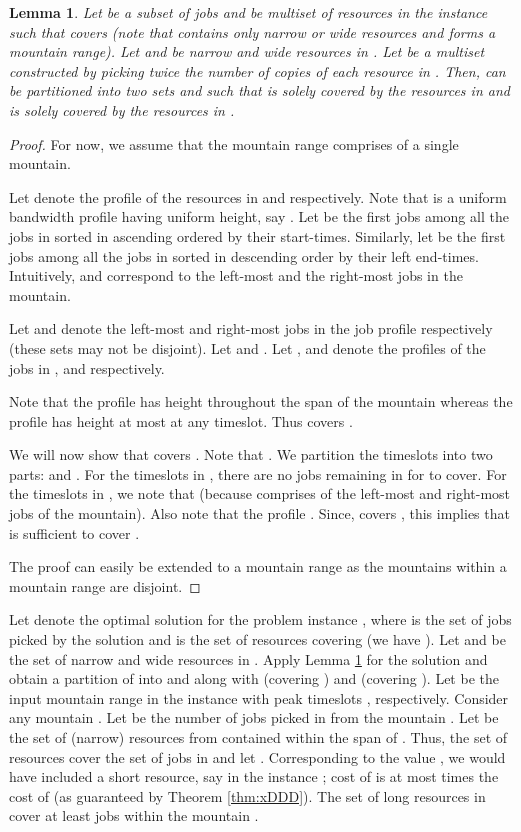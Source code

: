 \documentclass[11pt]{article}
\newtheorem{lemma}[theorem]{Lemma}
\newtheorem{proof}[theorem]{Proof}
\begin{document}
\begin{lemma}
\label{lem:LLL}
Let  be a subset of jobs and  be multiset of resources in the instance 
such that  covers  (note that  contains only narrow or wide resources and  forms a mountain range).
Let  and  be narrow and wide resources in . Let  be a multiset 
constructed by picking twice the number of copies of each resource in .
Then,  can be partitioned into two sets  and  such that  is solely covered by the resources in 
and  is solely covered by the resources in .
\end{lemma}
\begin{proof}
For now, we assume that the mountain range comprises of a single mountain.

Let  denote the profile of the resources in  and  respectively.
Note that  is a uniform bandwidth profile having uniform height, say .
Let  be the first  jobs among all the jobs in  sorted in ascending ordered by their start-times. 
Similarly, 
let  be the first  jobs among all the jobs in  sorted in descending order by their left end-times.
Intuitively,  and  correspond to the  left-most and the  right-most jobs in the mountain. 


Let  and  denote the  left-most and  right-most jobs in the job profile  respectively
(these sets may not be disjoint). Let  and .
Let ,  and  denote the profiles of the jobs in ,  and  respectively.

Note that the profile  has height  throughout the span of the mountain whereas the profile 
 has height at most  at any timeslot. Thus  covers .

We will now show that  covers .
Note that .
We partition the timeslots into two parts:  and .
For the timeslots in , there are no jobs remaining in  for  to cover. 
For the timeslots in , we note that 
(because  comprises of the left-most  and right-most  jobs of the mountain).
Also note that the profile .
Since,  covers , this implies that  is sufficient to cover .

The proof can easily be extended to a mountain range as the mountains within a mountain range are disjoint.
\end{proof}

Let  denote the optimal solution for the problem instance ,
where  is the set of jobs picked by the solution and  is the set of resources covering  (we have ).
Let  and  be the set of narrow and wide resources in .
Apply Lemma \ref{lem:LLL} for the solution  and obtain a partition of  into  and 
along with  (covering ) and  (covering ).
Let  be the input mountain range in the instance  with peak timeslots
, respectively. Consider any mountain .
Let  be the number of jobs picked in  from the mountain .
Let  be the set of (narrow) resources from  contained within the span of .
Thus, the set of resources  cover the set of jobs in  and let .
Corresponding to the value , we would have included a short resource, say 
in the instance ; cost of  is at most  times the cost of  
(as guaranteed by Theorem \ref{thm:xDDD}).
The set of long resources in  cover at least  jobs within the mountain .
\end{document}
